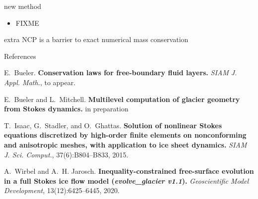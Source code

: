 \documentclass{beamer}
\begin{document}
\begin{frame}{new method}

\begin{itemize}
\item FIXME \cite{BuelerMitchell2022}
\end{itemize}
\end{frame}


\begin{frame}{extra}
 NCP is a barrier to exact numerical mass conservation \cite{Bueler2021conservation}
\end{frame}





\appendix

\begin{frame}{References}

%
%

\begin{thebibliography}{1}
E.~Bueler. \textbf{Conservation laws for free-boundary fluid layers.} {\em SIAM J. Appl. Math.}, to appear.

E.~Bueler and L.~Mitchell. \textbf{Multilevel computation of glacier geometry from Stokes dynamics.} in preparation

T.~Isaac, G.~Stadler, and O.~Ghattas.  \textbf{Solution of nonlinear Stokes equations discretized by high-order finite elements on nonconforming and anisotropic meshes, with application to ice sheet dynamics.} {\em SIAM J. Sci. Comput.}, 37(6):B804--B833, 2015.

A.~Wirbel and A.~H. Jarosch. \textbf{Inequality-constrained free-surface evolution in a full {S}tokes ice flow model (\textit{evolve\_glacier v1.1}).} {\em Geoscientific Model Development}, 13(12):6425--6445, 2020.
\end{thebibliography}

\end{frame}
\end{document}
